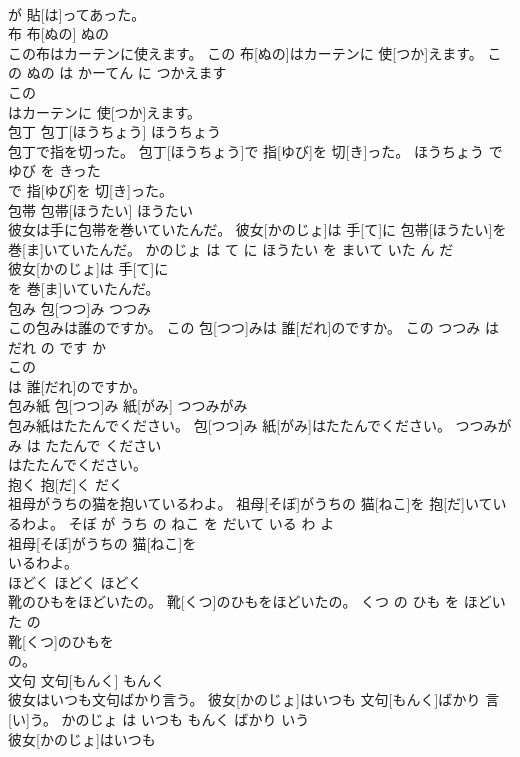 \documentclass[8pt]{extreport}
\begin{document}
\begin{CJK}{UTF8}{min}
\\	が 貼[は]ってあった。			
\\	布	布[ぬの]	ぬの	
\\	この布はカーテンに使えます。	この 布[ぬの]はカーテンに 使[つか]えます。	この ぬの は かーてん に つかえます	
\\	この
\\	はカーテンに 使[つか]えます。			
\\	包丁	包丁[ほうちょう]	ほうちょう	
\\	包丁で指を切った。	包丁[ほうちょう]で 指[ゆび]を 切[き]った。	ほうちょう で ゆび を きった	
\\	で 指[ゆび]を 切[き]った。			
\\	包帯	包帯[ほうたい]	ほうたい	
\\	彼女は手に包帯を巻いていたんだ。	彼女[かのじょ]は 手[て]に 包帯[ほうたい]を 巻[ま]いていたんだ。	かのじょ は て に ほうたい を まいて いた ん だ	
\\	彼女[かのじょ]は 手[て]に
\\	を 巻[ま]いていたんだ。			
\\	包み	包[つつ]み	つつみ	
\\	この包みは誰のですか。	この 包[つつ]みは 誰[だれ]のですか。	この つつみ は だれ の です か	
\\	この
\\	は 誰[だれ]のですか。			
\\	包み紙	包[つつ]み 紙[がみ]	つつみがみ	
\\	包み紙はたたんでください。	包[つつ]み 紙[がみ]はたたんでください。	つつみがみ は たたんで ください	
\\	はたたんでください。			
\\	抱く	抱[だ]く	だく	
\\	祖母がうちの猫を抱いているわよ。	祖母[そぼ]がうちの 猫[ねこ]を 抱[だ]いているわよ。	そぼ が うち の ねこ を だいて いる わ よ	
\\	祖母[そぼ]がうちの 猫[ねこ]を
\\	いるわよ。			
\\	ほどく	ほどく	ほどく	
\\	靴のひもをほどいたの。	靴[くつ]のひもをほどいたの。	くつ の ひも を ほどいた の	
\\	靴[くつ]のひもを
\\	の。			
\\	文句	文句[もんく]	もんく	
\\	彼女はいつも文句ばかり言う。	彼女[かのじょ]はいつも 文句[もんく]ばかり 言[い]う。	かのじょ は いつも もんく ばかり いう	
\\	彼女[かのじょ]はいつも

\end{CJK}
\end{document}
